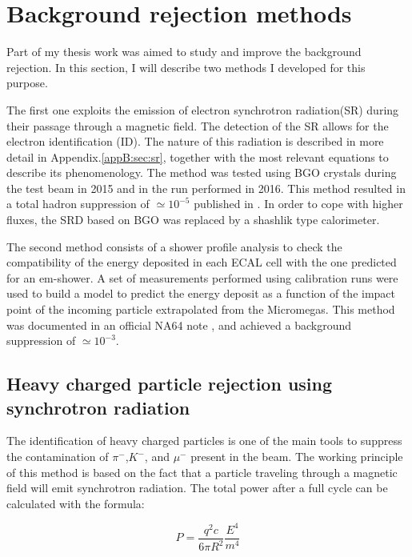 \section{Background rejection methods}

Part of my thesis work was aimed to study and improve the background rejection. In this section, I will describe two methods I developed for this purpose.

The first one exploits the emission of electron synchrotron radiation(SR) during their passage through a magnetic field. The detection of the SR allows for the electron identification (ID). The nature of this radiation is described in more detail in Appendix.\ref{appB:sec:sr}, together with the most relevant equations to describe its phenomenology. The method was tested using BGO crystals during the test beam in 2015 and in the run performed in 2016. This method resulted in a total hadron suppression of $\simeq 10^{-5}$ published in \cite{Depero:2017mrr}. In order to cope with higher fluxes, the SRD based on BGO was replaced by a shashlik type calorimeter.

The second method consists of a shower profile analysis to check the compatibility of the energy deposited in each ECAL cell with the one predicted for an em-shower. A set of measurements performed using calibration runs were used to build a model to predict the energy deposit as a function of the impact point of the incoming particle extrapolated from the Micromegas.  This method was documented in an official NA64 note \cite{na64-shower-profile}, and achieved a background suppression of $\simeq 10^{-3}$.

\subsection{Heavy charged particle rejection using synchrotron radiation}
\label{ch3:sec:bkg-srd}

The identification of heavy charged particles is one of the main tools to suppress the contamination of $\pi^-$,$K^-$, and $\mu^-$ present in the beam. The working principle of this method is based on the fact that a particle traveling through a magnetic field will emit synchrotron radiation. The total power after a full cycle can be calculated with the formula:

\begin{equation}
  \label{eq:srd-power}
  P = \frac{q^2 c}{6 \pi R^2}\frac{E^4}{m^4}
\end{equation}

